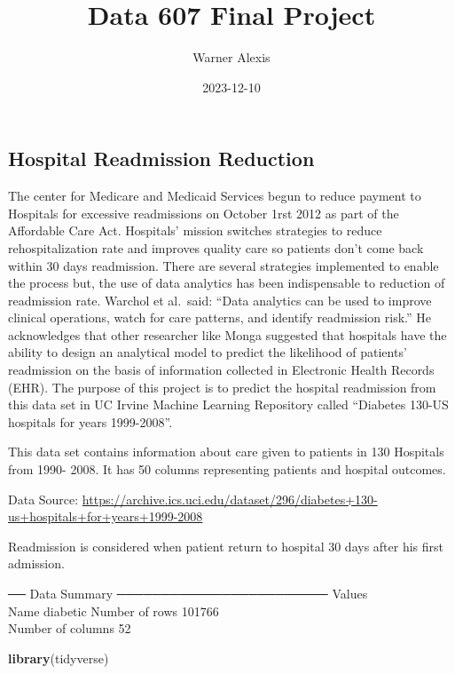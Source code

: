 \documentclass[
]{article}
\title{Data 607 Final Project}
\author{Warner Alexis}
\date{2023-12-10}
\newenvironment{Shaded}{\begin{snugshade}}{\end{snugshade}}
\newcommand{\FunctionTok}[1]{\textcolor[rgb]{0.13,0.29,0.53}{\textbf{#1}}}
\newcommand{\NormalTok}[1]{#1}
\begin{document}
\maketitle

\hypertarget{hospital-readmission-reduction}{%
\subsection{Hospital Readmission
Reduction}\label{hospital-readmission-reduction}}

The center for Medicare and Medicaid Services begun to reduce payment to
Hospitals for excessive readmissions on October 1rst 2012 as part of the
Affordable Care Act. Hospitals' mission switches strategies to reduce
rehospitalization rate and improves quality care so patients don't come
back within 30 days readmission. There are several strategies
implemented to enable the process but, the use of data analytics has
been indispensable to reduction of readmission rate. Warchol et
al.~said: ``Data analytics can be used to improve clinical operations,
watch for care patterns, and identify readmission risk.'' He
acknowledges that other researcher like Monga suggested that hospitals
have the ability to design an analytical model to predict the likelihood
of patients' readmission on the basis of information collected in
Electronic Health Records (EHR). The purpose of this project is to
predict the hospital readmission from this data set in UC Irvine Machine
Learning Repository called ``Diabetes 130-US hospitals for years
1999-2008''.

This data set contains information about care given to patients in 130
Hospitals from 1990- 2008. It has 50 columns representing patients and
hospital outcomes.

Data Source:
\url{https://archive.ics.uci.edu/dataset/296/diabetes+130-us+hospitals+for+years+1999-2008}

Readmission is considered when patient return to hospital 30 days after
his first admission.

── Data Summary ──────────────────────── Values\\
Name diabetic Number of rows 101766\\
Number of columns 52

\begin{Shaded}
\begin{Highlighting}[]
\FunctionTok{library}\NormalTok{(tidyverse)}
\end{Highlighting}
\end{Shaded}
\end{document}
